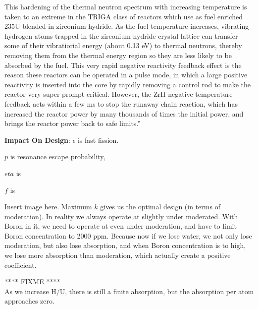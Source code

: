 \documentclass{school-22.211-notes}
\begin{document}
This hardening of the thermal neutron spectrum with increasing temperature
is taken to an extreme in the TRIGA class of reactors which use as fuel enriched 235U blended in zirconium hydride. As the fuel temperature increases, vibrating hydrogen atoms trapped in the zirconium-hydride crystal lattice can transfer some
of their vibratiorial energy (about 0.13 eV) to thermal neutrons, thereby removing
them from the thermal energy region so they are less likely to be absorbed by the
fuel. This very rapid negative reactivity feedback effect is the reason these reactors
can be operated in a pulse mode, in which a large positive reactivity is inserted into
the core by rapidly removing a control rod to make the reactor very super prompt
critical. However, the ZrH negative temperature feedback acts within a few ms to
stop the runaway chain reaction, which has increased the reactor power by many
thousands of times the initial power, and brings the reactor power back to safe
limits.'' 


\textbf{Impact On Design}: 
$\epsilon$ is fast fission. 

$p$ is resonance escape probability, 

$eta$ is 

$f$ is


Insert image here. Maximum $k$ gives us the optimal design (in terms of moderation). In reality we always operate at slightly under moderated. With Boron in it, we need to operate at even under moderation, and have to limit Boron concentration to 2000 ppm. Because now if we lose water, we not only lose moderation, but also lose absorption, and when Boron concentration is to high, we lose more absorption than moderation, which actually create a positive coefficient. 




**** FIXME **** \\
As we increase H/U, there is still a finite absorption, but the absorption per atom approaches zero. 
\end{document}
